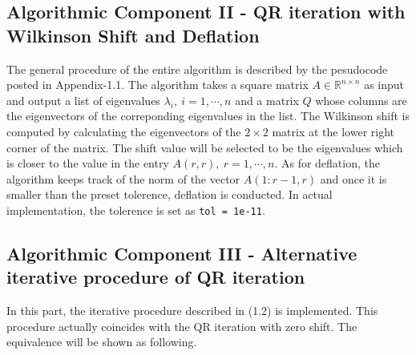 \subsection{Algorithmic Component II - QR iteration with Wilkinson Shift and Deflation}
The general procedure of the entire algorithm is described by the pesudocode posted in Appendix-1.1. The algorithm takes a square matrix $A \in \mathbb{R}^{n \times n}$ as input and output a list of eigenvalues $\lambda_i, \ i = 1,\cdots, n$ and a matrix $Q$ whose columns are the eigenvectors of the correponding eigenvalues in the list. The Wilkinson shift is computed by calculating the eigenvectors of the $2 \times 2$ matrix at the lower right corner of the matrix. The shift value will be selected to be the eigenvalues which is closer to the value in the entry $A(r, r), \ r = 1, \cdots, n$. As for deflation, the algorithm keeps track of the norm of the vector $A(1 : r - 1, r)$ and once it is smaller than the preset tolerence, deflation is conducted. In actual implementation, the tolerence is set as \lstinline{tol = 1e-11}. 

\subsection{Algorithmic Component III - Alternative iterative procedure of QR iteration}
In this part, the iterative procedure described in (1.2) is implemented. This procedure actually coincides with the QR iteration with zero shift. The equivalence will be shown as following. 

